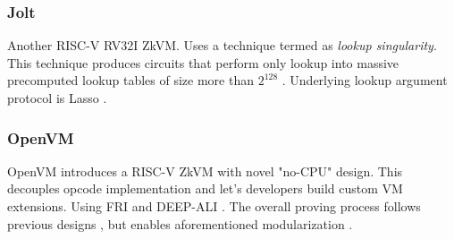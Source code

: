 \subsubsection*{Jolt}

Another RISC-V RV32I ZkVM. Uses a technique termed as \emph{lookup singularity}.
This technique produces circuits that perform only lookup into massive
precomputed lookup tables of size more than $2^{128}$ \cite{Jolt}. Underlying
lookup argument protocol is Lasso \cite{Lasso}.

\subsubsection*{OpenVM}

OpenVM introduces a RISC-V ZkVM with novel "no-CPU" design. This decouples
opcode implementation and let's developers build custom VM extensions. Using
FRI \cite{FRI} and DEEP-ALI \cite{DEEP-ALI}. The overall proving process follows
previous designs \cite{RISC0}, but enables aforementioned modularization \cite{OpenVM}.

